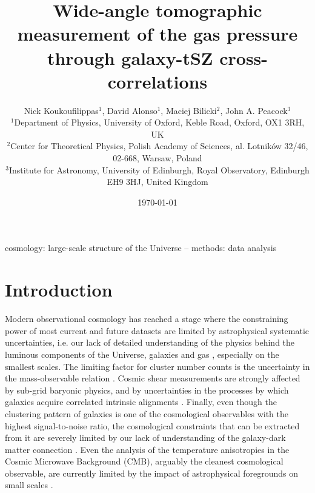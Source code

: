 \documentclass[useAMS,usenatbib]{mn2e}
\title[Tomographic measurement of the gas pressure through galaxy-tSZ cross-correlations]{Wide-angle tomographic measurement of the gas pressure through galaxy-tSZ cross-correlations}
\author[David Alonso]{Nick Koukoufilippas$^1$, David Alonso$^1$, Maciej Bilicki$^2$, John A. Peacock$^3$\\
                      $^{1}$Department of Physics, University of Oxford, Keble Road, Oxford, OX1 3RH, UK\\
                      $^{2}$Center for Theoretical Physics, Polish Academy of Sciences, al. Lotnik\'ow 32/46, 02-668, Warsaw, Poland\\
                      $^{3}$Institute for Astronomy, University of Edinburgh, Royal Observatory, Edinburgh EH9 3HJ, United Kingdom
                      }
\begin{document}
  \date{\today}
   
  \maketitle

\begin{abstract}
  \lipsum[1]
\end{abstract}

\begin{keywords}
  cosmology: large-scale structure of the Universe -- methods: data analysis
\end{keywords}

\section{Introduction}\label{sec:intro}
  Modern observational cosmology has reached a stage where the constraining power of most current and future datasets are limited by astrophysical systematic uncertainties, i.e. our lack of detailed understanding of the physics behind the luminous components of the Universe, galaxies and gas \citep[e.g.][]{2011MNRAS.415.3649V,2011MNRAS.417.2020S,2014JCAP...04..028F,2015MNRAS.454.2451E,2015MNRAS.454.1958M,2015JCAP...12..049S,2019MNRAS.488.1652H,2019JCAP...03..020S,2019OJAp....2E...4C}, especially on the smallest scales. The limiting factor for cluster number counts is the uncertainty in the mass-observable relation \citep{2009ApJ...692.1060V,2010ApJ...722.1180V,2011ApJ...732...44S,2013JCAP...07..008H,2014MNRAS.440.2077M,2014A&A...571A..20P,2015MNRAS.446.2205M,2016A&A...594A..24P,2016ApJ...832...95D,2019ApJ...878...55B}. Cosmic shear measurements are strongly affected by sub-grid baryonic physics, and by uncertainties in the processes by which galaxies acquire correlated intrinsic alignments \citep[e.g.][]{2001MNRAS.320L...7C,2002MNRAS.332..788M,2004PhRvD..70f3526H,2017MNRAS.465.2033J,2018PhRvD..98d3528T,2018arXiv181206076H,2018ARA&A..56..393M,2018arXiv181106989S}. Finally, even though the clustering pattern of galaxies is one of the cosmological observables with the highest signal-to-noise ratio, the cosmological constraints that can be extracted from it are severely limited by our lack of understanding of the galaxy-dark matter connection \citep[see e.g.][and references therein]{2018ARA&A..56..435W}. Even the analysis of the temperature anisotropies in the Cosmic Microwave Background (CMB), arguably the cleanest cosmological observable, are currently limited by the impact of astrophysical foregrounds on small scales \citep{2014ApJ...782...74H,2017JCAP...06..031L,2019arXiv190712875P}.
  
\end{document}
